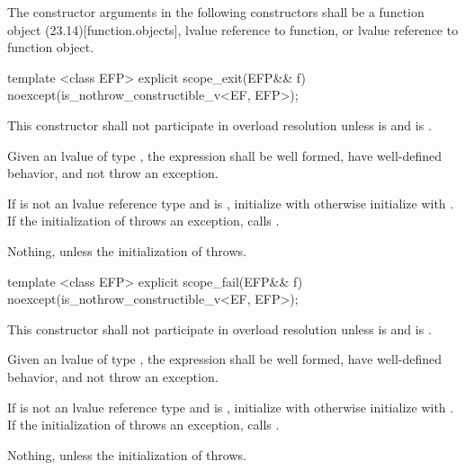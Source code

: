 \documentclass[ebook,11pt,article]{memoir}
\begin{document}
\pnum
The constructor arguments  in the following constructors shall be a function object (23.14)[function.objects], 
lvalue reference to function, or 
lvalue reference to function object.


\begin{itemdecl}
template <class EFP>
explicit
scope_exit(EFP&& f) noexcept(is_nothrow_constructible_v<EF, EFP>);
\end{itemdecl}

\begin{itemdescr}

\pnum
\remarks
This constructor shall not participate in overload resolution unless
 is 
and  is .

\pnum
\requires Given an lvalue  of type , the expression  shall be well formed, have well-defined behavior, and not throw an exception.


\pnum
\effects If  is not an lvalue reference type and  is , initialize   with  otherwise initialize  with . 
If the initialization of  throws an exception, calls .

\pnum
\throws Nothing, unless the initialization of  throws.
\end{itemdescr}


\begin{itemdecl}
template <class EFP>
explicit
scope_fail(EFP&& f) noexcept(is_nothrow_constructible_v<EF, EFP>);

\end{itemdecl}

\begin{itemdescr}
\pnum
\remarks This constructor shall not participate in overload resolution unless 
 is 
and  is .

\pnum
\requires Given an lvalue  of type , the expression  shall be well formed, have well-defined behavior, and not throw an exception.

\pnum
\effects If  is not an lvalue reference type and  is , initialize   with  otherwise initialize  with . If the initialization of  throws an exception, calls .

\pnum
\throws Nothing, unless the initialization of  throws.

\end{itemdescr}
\end{document}
